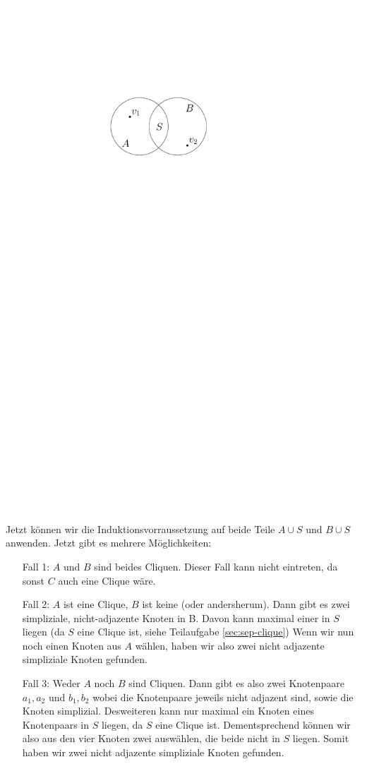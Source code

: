 \begin{center}
    \vspace{1ex}
    \includegraphics[page=1]{fig/03-2b-sep}
\end{center}

Jetzt können wir die Induktionsvorraussetzung auf beide Teile $A \cup S$ und $B \cup S$ anwenden.
Jetzt gibt es mehrere Möglichkeiten:

\begin{itemize}
    \item [Fall 1:] $A$ und $B$ sind beides Cliquen. Dieser Fall kann nicht eintreten, da sonst $C$ auch eine Clique wäre.
    \item [Fall 2:] $A$ ist eine Clique, $B$ ist keine (oder andersherum). Dann gibt es zwei simpliziale, nicht-adjazente Knoten in B. Davon kann maximal einer in $S$ liegen (da $S$ eine Clique ist, siehe Teilaufgabe \ref{sec:sep-clique})
    Wenn wir nun noch einen Knoten aus $A$ wählen, haben wir also zwei nicht adjazente simpliziale Knoten gefunden.
    \item [Fall 3:] Weder $A$ noch $B$ sind Cliquen. Dann gibt es also zwei Knotenpaare $a_1, a_2$ und $b_1, b_2$ wobei die Knotenpaare jeweils nicht adjazent sind, sowie die Knoten simplizial. Desweiteren kann nur maximal ein Knoten eines Knotenpaars in $S$ liegen, da $S$ eine Clique ist.
    Dementsprechend können wir also aus den vier Knoten zwei auswählen, die beide nicht in $S$ liegen. Somit haben wir zwei nicht adjazente simpliziale Knoten gefunden.
\end{itemize}


